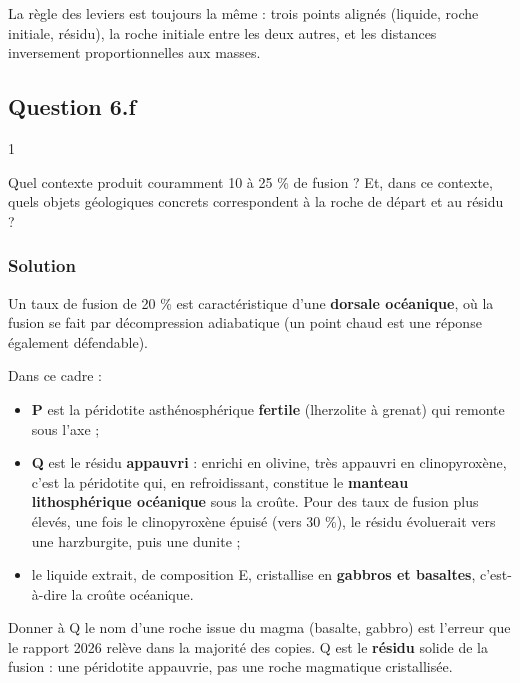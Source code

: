 \documentclass[11pt,a4paper]{article}
\providecommand{\tightlist}{\setlength{\itemsep}{0pt}\setlength{\parskip}{0pt}}
\begin{document}
\begin{methode}

La règle des leviers est toujours la même : trois points alignés (liquide, roche initiale, résidu), la roche initiale entre les deux autres, et les distances inversement proportionnelles aux masses.

\end{methode}

\hypertarget{question-6.f}{%
\subsection{Question 6.f}\label{question-6.f}}

\begin{indication}{1}

Quel contexte produit couramment 10 à 25 \% de fusion ? Et, dans ce contexte, quels objets géologiques concrets correspondent à la roche de départ et au résidu ?

\end{indication}

\hypertarget{solution-21}{%
\subsubsection{Solution}\label{solution-21}}

Un taux de fusion de 20 \% est caractéristique d'une \textbf{dorsale océanique}, où la fusion se fait par décompression adiabatique (un point chaud est une réponse également défendable).

Dans ce cadre :

\begin{itemize}
\tightlist
\item
  \textbf{P} est la péridotite asthénosphérique \textbf{fertile} (lherzolite à grenat) qui remonte sous l'axe ;
\item
  \textbf{Q} est le résidu \textbf{appauvri} : enrichi en olivine, très appauvri en clinopyroxène, c'est la péridotite qui, en refroidissant, constitue le \textbf{manteau lithosphérique océanique} sous la croûte. Pour des taux de fusion plus élevés, une fois le clinopyroxène épuisé (vers 30 \%), le résidu évoluerait vers une harzburgite, puis une dunite ;
\item
  le liquide extrait, de composition E, cristallise en \textbf{gabbros et basaltes}, c'est-à-dire la croûte océanique.
\end{itemize}

\begin{piege}

Donner à Q le nom d'une roche issue du magma (basalte, gabbro) est l'erreur que le rapport 2026 relève dans la majorité des copies. Q est le \textbf{résidu} solide de la fusion : une péridotite appauvrie, pas une roche magmatique cristallisée.

\end{piege}
\end{document}

